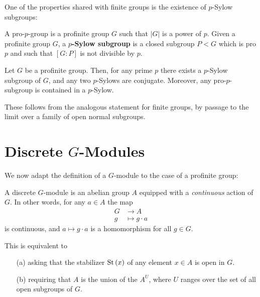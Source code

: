 \documentclass[a4paper, oneside]{memoir}
\begin{document}
One of the properties shared with finite groups is the existence of $p$-Sylow subgroups:
\begin{definition}
	A pro-$p$-group is a profinite group $G$ such that $|G|$ is a power of $p$. Given a profinite group $G$, a \textbf{$p$-Sylow subgroup} is a closed subgroup $P<G$ which is pro$p$ and such that $[G:P]$ is not divisible by $p$.
\end{definition}

\begin{proposition}
	Let $G$ be a profinite group. Then, for any prime $p$ there exists a $p$-Sylow subgroup of $G$, and any two $p$-Sylows are conjugate. Moreover, any pro-$p$-subgroup is contained in a $p$-Sylow.
\end{proposition}

These follows from the analogous statement for finite groups, by passage to the limit over a family of open normal subgroups.


\section{\texorpdfstring{Discrete $G$-Modules}{Discrete G-Modules}}

We now adapt the definition of a $G$-module to the case of a profinite group:

\begin{definition}
	A discrete $G$-module is an abelian group $A$ equipped with a \textit{continuous} action of $G$. In other words, for any $a\in A$ the map
	\begin{align*}
		G & \to A            \\
		g & \mapsto g\cdot a
	\end{align*}
	is continuous, and $a\mapsto g\cdot a$ is a homomorphism for all $g\in G$.
\end{definition}

\begin{remark}\label{rm:discGmodUnion}
	This is equivalent to
	\begin{itemize}
		\item[(a)] asking that the stabilizer $\operatorname{St}{(x)}$ of any element $x \in A$ is open in $G$.
		\item[(b)] requiring that $A$ is the union of the $A^U$, where $U$ ranges over the set of all open subgroups of $G$.
	\end{itemize}
\end{remark}
\end{document}

